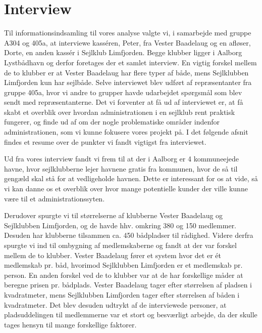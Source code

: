 \chapter{Interview}\label{chap:Interview}
Til informationsindsamling til vores analyse valgte vi, i samarbejde med gruppe A304 og 405a, at interviewe kasséren,
Peter, fra Vester Baadelaug og en afløser, Dorte, en anden kassér i Sejlklub Limfjorden. Begge klubber ligger i
Aalborg Lystbådhavn og derfor foretages der et samlet interview. En vigtig forskel mellem de to klubber er at Vester
Baadelaug har flere typer af både, mens Sejlklubben Limfjorden kun har sejlbåde. Selve interviewet blev udført af
repræsentanter fra gruppe 405a, hvor vi andre to grupper havde udarbejdet spørgsmål som blev sendt med repræsentanterne.
Det vi forventer at få ud af interviewet er, at få skabt et overblik over hvordan administrationen i en sejlklub rent
praktisk fungerer, og finde ud af om der nogle problematiske områder indenfor administrationen, som vi kunne fokusere
vores projekt på. I det følgende afsnit findes et resume over de punkter vi fandt vigtigst fra interviewet.

Ud fra vores interview fandt vi frem til at der i Aalborg er 4 kommuneejede havne, hvor sejlklubberne lejer havnene
gratis fra kommunen, hvor de så til gengæld skal stå for at vedligeholde havnen. Dette er interessant for os at vide, så
vi kan danne os et overblik over hvor mange potentielle kunder der ville kunne være til et administrationssyten. 

Derudover spurgte vi til størrelserne af klubberne Vester Baadelaug og Sejlklubben Limfjorden, og de havde hhv. omkring
380 og 150 medlemmer. Desuden har klubberne tilsammen ca. 450 bådpladser til rådighed. Videre derfra spurgte vi ind til
ombygning af medlemskaberne og fandt at der var forskel mellem de to klubber. Vester Baadelaug fører et system hvor det er
ét medlemskab pr. båd, hvorimod Sejlklubben Limfjorden er et medlemskab pr. person. En anden forskel ved de to klubber
var at de har forskellige måder at beregne prisen pr. bådplads. Vester Baadelaug tager efter størrelsen af pladsen i
kvadratmeter, mens Sejlklubben Limfjorden tager efter størrelsen af båden i kvadratmeter. Det blev desuden udtrykt af de
interviewede personer, at pladsuddelingen til medlemmerne var et stort og besværligt arbejde, da der skulle tages
hensyn til mange forskellige faktorer.

